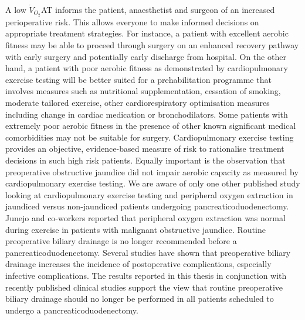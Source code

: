 A low $\dot{V}_{O_2}$AT informs the patient, anaesthetist and surgeon of an increased perioperative risk. This allows everyone to make informed decisions on appropriate treatment strategies. For instance, a patient with excellent aerobic fitness may be able to proceed through surgery on an enhanced recovery pathway with early surgery and potentially early discharge from hospital. On the other hand, a patient with poor aerobic fitness as demonstrated by cardiopulmonary exercise testing will be better suited for a prehabilitation programme that involves measures such as nutritional supplementation, cessation of smoking, moderate tailored exercise, other cardiorespiratory optimisation measures including change in cardiac medication or bronchodilators. Some patients with extremely poor aerobic fitness in the presence of other known significant medical comorbidities may not be suitable for surgery. Cardiopulmonary exercise testing provides an objective, evidence-based measure of risk to rationalise treatment decisions in such high risk patients.
Equally important is the observation that preoperative obstructive jaundice did not impair aerobic capacity as measured by cardiopulmonary exercise testing. We are aware of only one other published study looking at cardiopulmonary exercise testing and peripheral oxygen extraction in jaundiced versus non-jaundiced patients undergoing pancreaticoduodenectomy. Junejo and co-workers reported that peripheral oxygen extraction was normal during exercise in patients with malignant obstructive jaundice.\parencite{junejo_peripheral_2014} 
Routine preoperative biliary drainage is no longer recommended before a pancreaticoduodenectomy. Several studies have shown that preoperative biliary drainage increases the incidence of postoperative complications, especially infective complications. \parencite{van_der_gaag_preoperative_2010, arkadopoulos_preoperative_2014, fujii_preoperative_2015, furukawa_negative_2015}
The results reported in this thesis in conjunction with recently published clinical studies support the view that routine preoperative biliary drainage should no longer be performed in all patients scheduled to undergo a pancreaticoduodenectomy.
